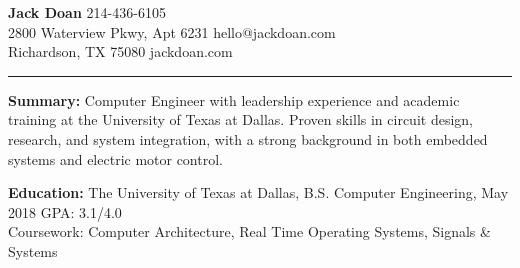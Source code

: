 \documentclass[11pt,english]{article}
\begin{document}
\textbf{\Large Jack Doan}
\hfill
214-436-6105\\
2800 Waterview Pkwy, Apt 6231
\hfill
hello@jackdoan.com \\
Richardson, TX 75080
\hfill
jackdoan.com \\
\textcolor[RGB]{220,220,220}{\rule{\linewidth}{0.2pt}}

\vspace{0.5em}
\textbf{Summary:} Computer Engineer with leadership experience and academic training at the University of Texas at Dallas. Proven skills in circuit design, research, and system integration, with a strong background in both embedded systems and electric motor control.

\vspace{0.75em}
\textbf{Education:} The University of Texas at Dallas, B.S. Computer Engineering, May 2018
\hfill
GPA: 3.1/4.0 \\
Coursework: Computer Architecture, Real Time Operating Systems, Signals \& Systems
\end{document}
